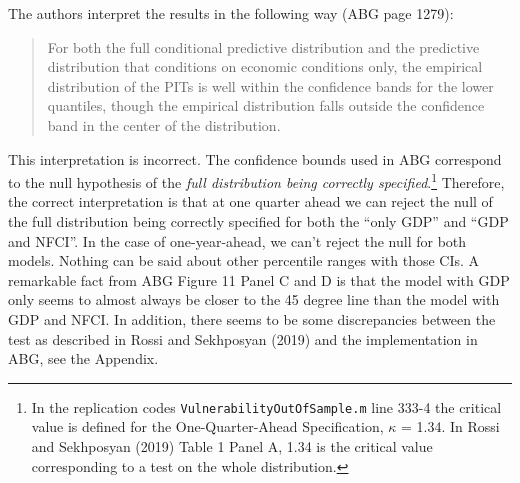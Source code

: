 \documentclass[11pt,]{article}
\let\rmarkdownfootnote\footnote%
\def\footnote{\protect\rmarkdownfootnote}
\begin{document}
The authors interpret the results in the following way (ABG page 1279):

\begin{quote}
For both the full conditional predictive distribution and the predictive
distribution that conditions on economic conditions only, the empirical
distribution of the PITs is well within the confidence bands for the
lower quantiles, though the empirical distribution falls outside the
confidence band in the center of the distribution.
\end{quote}

This interpretation is incorrect. The confidence bounds used in ABG
correspond to the null hypothesis of the
\textit{full distribution being correctly specified}.\footnote{In the replication codes \texttt{VulnerabilityOutOfSample.m} line 333-4 the critical value is defined for the One-Quarter-Ahead Specification, $\kappa$ = 1.34. In Rossi and Sekhposyan (2019) Table 1 Panel A, 1.34 is the critical value corresponding to a test on the whole distribution.}
Therefore, the correct interpretation is that at one quarter ahead we
can reject the null of the full distribution being correctly specified
for both the ``only GDP'' and ``GDP and NFCI''. In the case of
one-year-ahead, we can't reject the null for both models. Nothing can be
said about other percentile ranges with those CIs. A remarkable fact
from ABG Figure 11 Panel C and D is that the model with GDP only seems
to almost always be closer to the 45 degree line than the model with GDP
and NFCI. In addition, there seems to be some discrepancies between the
test as described in Rossi and Sekhposyan (2019) and the implementation
in ABG, see the Appendix.
\end{document}
